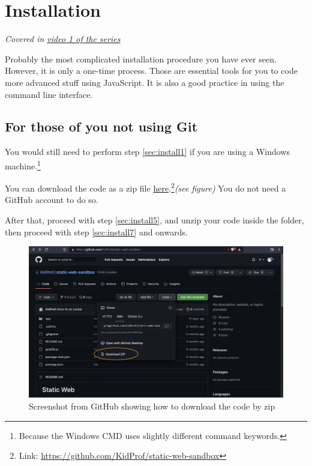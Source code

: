 \chapter{Installation}

\textit{Covered in \href{https://www.youtube.com/watch?v=oIsH0V3fRt8&list=PLjGmdnqrOKuYXiu7lgG5HW71jPEUd1XCm&index=2}{video 1 of the series}}
\vspace{6mm}

Probably the most complicated installation procedure you have ever seen. However, it is only a one-time process. Those are essential tools for you to code more advanced stuff using JavaScript. It is also a good practice in using the command line interface.

\section*{For those of you not using Git}

You would still need to perform step \cref{sec:install1} if you are using a Windows machine.\footnote{Because the Windows CMD uses slightly different command keywords.}

You can download the code as a zip file \href{https://github.com/KidProf/static-web-sandbox}{here}.\footnote{Link: \url{https://github.com/KidProf/static-web-sandbox}}\textit{(see figure)} You do not need a GitHub account to do so. 

After that, proceed with step \cref{sec:install5}, and unzip your code inside the folder, then proceed with step \cref{sec:install7} and onwards.

\begin{figure}[h]
\centering
\includegraphics[width=15cm]{images/ch1-download-as-zip.png}
\caption{Screenshot from GitHub showing how to download the code by zip}
\end{figure}

